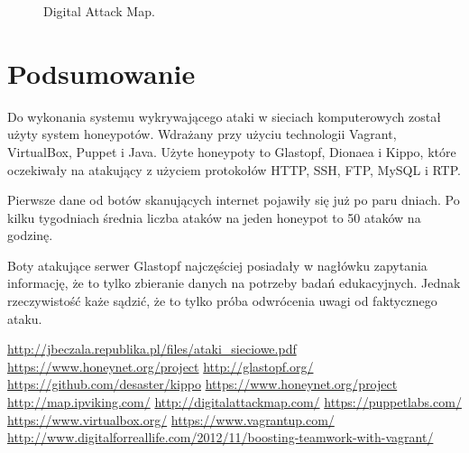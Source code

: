 \documentclass[runningheads,a4paper]{llncs}
\begin{document}
\begin{figure}
        \centering
        \caption{Digital Attack Map.}
        \label{fig:digitalattackmap_fig}
\end{figure}

\section{Podsumowanie}

Do wykonania systemu wykrywającego ataki w sieciach komputerowych został użyty system honeypotów. Wdrażany przy użyciu technologii Vagrant, VirtualBox, Puppet i Java. Użyte honeypoty to Glastopf, Dionaea i Kippo, które oczekiwały na atakujący z użyciem protokołów HTTP, SSH, FTP, MySQL i RTP.

Pierwsze dane od botów skanujących internet pojawiły się już po paru dniach. Po kilku tygodniach średnia liczba ataków na jeden honeypot to 50 ataków na godzinę.

Boty atakujące serwer Glastopf najczęściej posiadały w nagłówku zapytania informację, że to tylko zbieranie danych na potrzeby badań edukacyjnych. Jednak rzeczywistość każe sądzić, że to tylko próba odwrócenia uwagi od faktycznego ataku.

\begin{thebibliography}{1}


\bibitem{} \url{http://jbeczala.republika.pl/files/ataki_sieciowe.pdf}
 \url{https://www.honeynet.org/project}
\bibitem{} \url{http://glastopf.org/}
\bibitem{} \url{https://github.com/desaster/kippo}
\bibitem{} \url{https://www.honeynet.org/project}
\bibitem{} \url{http://map.ipviking.com/}
\bibitem{} \url{http://digitalattackmap.com/}
\bibitem{} \url{https://puppetlabs.com/}
\bibitem{} \url{https://www.virtualbox.org/}
\bibitem{} \url{https://www.vagrantup.com/}
\bibitem{} \url{http://www.digitalforreallife.com/2012/11/boosting-teamwork-with-vagrant/}


\end{thebibliography}
\end{document}
